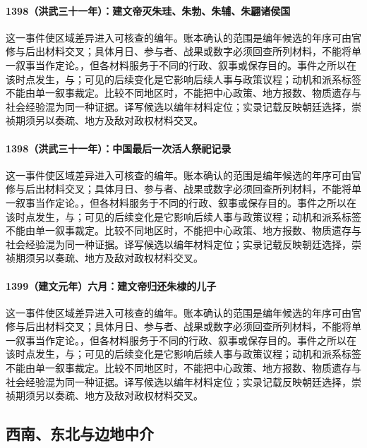 \paragraph{1398（洪武三十一年）：建文帝灭朱珪、朱勃、朱辅、朱翩诸侯国} 这一事件使区域差异进入可核查的编年。账本确认的范围是编年候选的年序可由官修与后出材料交叉；具体月日、参与者、战果或数字必须回查所列材料，不能将单一叙事当作定论。，但各材料服务于不同的行政、叙事或保存目的。事件之所以在该时点发生，与；可见的后续变化是它影响后续人事与政策议程；动机和派系标签不能由单一叙事裁定。比较不同地区时，不能把中心政策、地方报数、物质遗存与社会经验混为同一种证据。译写候选以编年材料定位；实录记载反映朝廷选择，崇祯期须另以奏疏、地方及敌对政权材料交叉。

\paragraph{1398（洪武三十一年）：中国最后一次活人祭祀记录} 这一事件使区域差异进入可核查的编年。账本确认的范围是编年候选的年序可由官修与后出材料交叉；具体月日、参与者、战果或数字必须回查所列材料，不能将单一叙事当作定论。，但各材料服务于不同的行政、叙事或保存目的。事件之所以在该时点发生，与；可见的后续变化是它影响后续人事与政策议程；动机和派系标签不能由单一叙事裁定。比较不同地区时，不能把中心政策、地方报数、物质遗存与社会经验混为同一种证据。译写候选以编年材料定位；实录记载反映朝廷选择，崇祯期须另以奏疏、地方及敌对政权材料交叉。

\paragraph{1399（建文元年）六月：建文帝归还朱棣的儿子} 这一事件使区域差异进入可核查的编年。账本确认的范围是编年候选的年序可由官修与后出材料交叉；具体月日、参与者、战果或数字必须回查所列材料，不能将单一叙事当作定论。，但各材料服务于不同的行政、叙事或保存目的。事件之所以在该时点发生，与；可见的后续变化是它影响后续人事与政策议程；动机和派系标签不能由单一叙事裁定。比较不同地区时，不能把中心政策、地方报数、物质遗存与社会经验混为同一种证据。译写候选以编年材料定位；实录记载反映朝廷选择，崇祯期须另以奏疏、地方及敌对政权材料交叉。

\subsection{西南、东北与边地中介}

